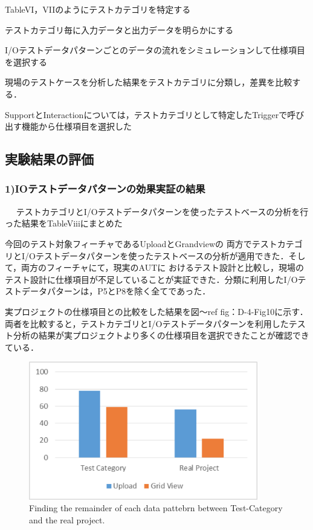 \documentclass[a4paper,12pt]{jreport}
\begin{document}
TableVI，VIIのようにテストカテゴリを特定する

テストカテゴリ毎に入力データと出力データを明らかにする

I/Oテストデータパターンごとのデータの流れをシミュレーションして仕様項目を選択する

現場のテストケースを分析した結果をテストカテゴリに分類し，差異を比較する．

SupportとInteractionについては，テストカテゴリとして特定したTriggerで呼び出す機能から仕様項目を選択した

\subsection{実験結果の評価}

\subsubsection{1)IOテストデータパターンの効果実証の結果}
　
テストカテゴリとI/Oテストデータパターンを使ったテストベースの分析を行った結果をTableViiiにまとめた

今回のテスト対象フィーチャであるUploadとGrandviewの 両方でテストカテゴリとI/Oテストデータパターンを使ったテストベースの分析が適用できた．そして，両方のフィーチャにて，現実のAUTに おけるテスト設計と比較し，現場のテスト設計に仕様項目が不足していることが実証できた．分類に利用したI/Oテストデータパターンは，P5とP8を除く全てであった．



実プロジェクトの仕様項目との比較をした結果を図〜ref {fig：D-4-Fig10}に示す．両者を比較すると，テストカテゴリとI/Oテストデータパターンを利用したテスト分析の結果が実プロジェクトより多くの仕様項目を選択できたことが確認できている．
   \begin{figure}[htbp]
  \begin{center}
  \includegraphics[width=10cm]{./image/D-4-Fig10.png}
  \caption{Finding the remainder of each data pattebrn between Test-Category and the real project.}
  \label{fig:D-4-Fig10}
  \end{center}
   \end{figure}
\end{document}
